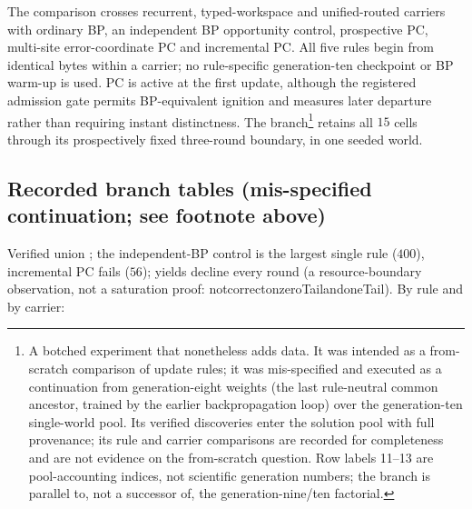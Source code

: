\documentclass[11pt]{article}
\newcommand{\leanname}[1]{{\scriptsize\ttfamily
  \def\_{\textunderscore\allowbreak}#1}}
\newif\ifoeisterminalfacts
\begin{document}
The comparison crosses recurrent, typed-workspace and unified-routed carriers with
ordinary BP, an independent BP opportunity control, prospective PC, multi-site
error-coordinate PC and incremental PC. All five rules begin from identical bytes
within a carrier; no rule-specific generation-ten checkpoint or BP warm-up is used.
PC is active at the first update, although the registered admission gate permits
BP-equivalent ignition and measures later departure rather than requiring instant
distinctness. The branch\footnote{A botched experiment that nonetheless adds data.
It was intended as a from-scratch comparison of update rules; it was mis-specified
and executed as a continuation from generation-eight weights (the last rule-neutral
common ancestor, trained by the earlier backpropagation loop) over the
generation-ten single-world pool. Its verified discoveries enter the solution pool
with full provenance; its rule and carrier comparisons are recorded for completeness
and are not evidence on the from-scratch question. Row labels 11--13 are
pool-accounting indices, not scientific generation numbers; the branch is parallel
to, not a successor of, the generation-nine/ten factorial.} retains all $15$ cells
through its prospectively fixed three-round boundary, in one seeded world.

\ifoeisterminalfacts
\subsection{Recorded branch tables (mis-specified continuation; see footnote above)}
\label{sec:nn-terminal}

Verified union \oeisTerminalCumulativeUnion{}; the independent-BP control is the
largest single rule ($400$), incremental PC fails ($56$); yields decline every round
(a resource-boundary observation, not a saturation proof:
\leanname{not\_correct\_on\_zeroTail\_and\_oneTail}). By rule
and by carrier:

\begin{center}\scriptsize
{}
\end{center}
\begin{center}\scriptsize
{}
\end{center}
\end{document}
